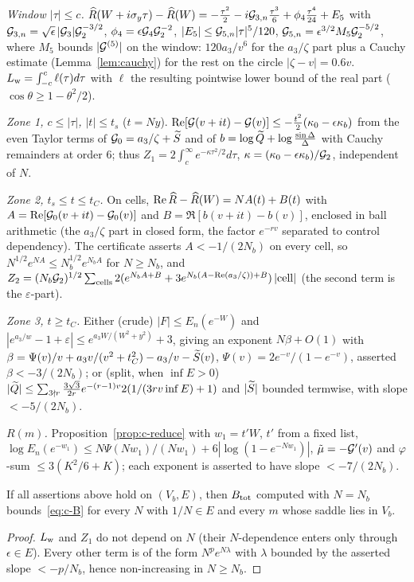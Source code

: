 \smallskip\noindent\emph{Window $|\tau|\le c$.}
$\widehat R(W+i\sigma_y\tau)-\widehat R(W)=-\frac{\tau^2}2-i\mathcal G_{3,n}\frac{\tau^3}6+\phi_4\frac{\tau^4}{24}+E_5$ with
$\mathcal G_{3,n}=\sqrt\epsilon\,|\mathcal G_3|\mathcal G_2^{-3/2}$, $\phi_4=\epsilon \mathcal G_4\mathcal G_2^{-2}$, $|E_5|\le \mathcal G_{5,n}|\tau|^5/120$,
$\mathcal G_{5,n}=\epsilon^{3/2}M_5\mathcal G_2^{-5/2}$, where $M_5$ bounds $|\mathcal G^{(5)}|$ on the window: $120a_3/v^6$ for the $a_3/\zeta$
part plus a Cauchy estimate (Lemma~\ref{lem:cauchy}) for the rest on the circle $|\zeta-v|=0.6v$.
$L_{\rm w}=\int_{-c}^{c}\ell(\tau)d\tau$ with $\ell$ the resulting pointwise lower bound of the real part
($\cos\theta\ge1-\theta^2/2$).

\smallskip\noindent\emph{Zone 1, $c\le|\tau|$, $|t|\le t_s$} ($t=Ny$). $\operatorname{Re}[\mathcal G(v+it)-\mathcal G(v)]\le-\frac{t^2}2(\kappa_0-\epsilon\kappa_b)$
from the even Taylor terms of $\mathcal G_0=a_3/\zeta+\widetilde S$ and of $b=\log\widetilde Q+\log\frac{\sin\Delta}\Delta$ with Cauchy remainders at
order $6$; thus $Z_1=2\int_c^\infty e^{-\kappa\tau^2/2}d\tau$, $\kappa=(\kappa_0-\epsilon\kappa_b)/\mathcal G_2$, independent of $N$.

\smallskip\noindent\emph{Zone 2, $t_s\le t\le t_C$.} On cells, $\operatorname{Re}\widehat R-\widehat R(W)=NA(t)+B(t)$ with
$A=\operatorname{Re}[\mathcal G_0(v+it)-\mathcal G_0(v)]$ and $B=\Re[b(v+it)-b(v)]$, enclosed in ball arithmetic (the $a_3/\zeta$ part in closed form,
the factor $e^{-rv}$ separated to control dependency). The certificate asserts $A<-1/(2N_b)$ on every cell, so
$N^{1/2}e^{NA}\le N_b^{1/2}e^{N_bA}$ for $N\ge N_b$, and
$Z_2=(N_b\mathcal G_2)^{1/2}\sum_{\rm cells}2(e^{N_bA+B}+3e^{N_b(A-\operatorname{Re}(a_3/\zeta))+B})\,|{\rm cell}|$ (the second term is the
$\varepsilon$-part).

\smallskip\noindent\emph{Zone 3, $t\ge t_C$.} Either (crude) $|F|\le E_n(e^{-W})$ and
$|e^{a_3/w}-1+\varepsilon|\le e^{a_3W/(W^2+y^2)}+3$, giving an exponent $N\beta+O(1)$ with
$\beta=\Psi(v)/v+a_3v/(v^2+t_C^2)-a_3/v-\widetilde S(v)$, $\Psi(v)=2e^{-v}/(1-e^{-v})$, asserted $\beta<-3/(2N_b)$; or (split,
when $\inf E>0$) $|\widetilde Q|\le\sum_{3\nmid r}\frac{3\sqrt3}{2r}e^{-(r-1)v}2(1/(3rv\inf E)+1)$ and $|\widetilde S|$ bounded termwise,
with slope $<-5/(2N_b)$.

\smallskip\noindent\emph{$R(m)$.} Proposition~\ref{prop:c-reduce} with $w_1=t'W$, $t'$ from a fixed list,
$\log E_n(e^{-w_1})\le N\Psi(Nw_1)/(Nw_1)+6|\log(1-e^{-Nw_1})|$, $\tilde\mu=-\mathcal G'(v)$ and $\varphi$-sum $\le3(K^2/6+K)$;
each exponent is asserted to have slope $<-7/(2N_b)$.

\begin{lemma}\label{lem:c-monotone}
If all assertions above hold on $(V_b,E)$, then $B_{\rm tot}$ computed with $N=N_b$ bounds~\eqref{eq:c-B} for every $N$
with $1/N\in E$ and every $m$ whose saddle lies in $V_b$.
\end{lemma}
\begin{proof}
$L_{\rm w}$ and $Z_1$ do not depend on $N$ (their $N$-dependence enters only through $\epsilon\in E$). Every other term is
of the form $N^pe^{N\lambda}$ with $\lambda$ bounded by the asserted slope $<-p/N_b$, hence non-increasing in $N\ge N_b$.
\end{proof}


